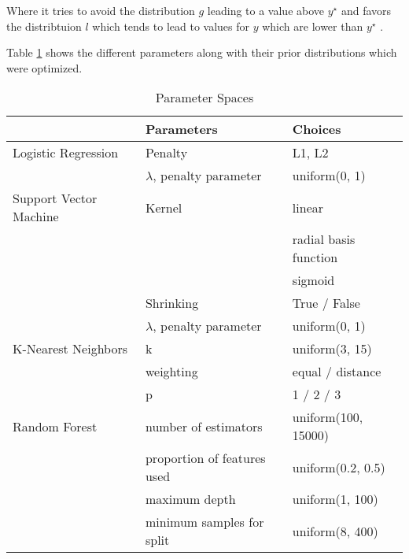 Where it tries to avoid the distribution $g$ leading to a value above $y^\star$ and favors the distribtuion $l$ which tends to lead to values for $y$ which are lower than $y^\star$ \cite{tpe}.

Table \ref{spaces} shows the different parameters along with their prior distributions which were optimized.

\begin{table}
\centering
\caption{Parameter Spaces}
\label{spaces}
\begin{tabular}{lll}
                            & Parameters                  & Choices                                \\ \hline
Logistic Regression         & Penalty                     & L1, L2                                 \\
                            & $\lambda$, penalty parameter       & uniform(0, 1)                          \\
Support Vector Machine      & Kernel                      & linear \\
                            &                             & radial basis function\\
                            &                             &  sigmoid \\
                            & Shrinking                   & True / False                           \\
                            & $\lambda$, penalty parameter                      & uniform(0, 1)                          \\
K-Nearest Neighbors         & k                           & uniform(3, 15)                         \\
                            & weighting                   & equal / distance                       \\
                            & p                           & 1  / 2 / 3                             \\
Random Forest               & number of estimators        & uniform(100, 15000)                    \\
                            & proportion of features used & uniform(0.2, 0.5)                      \\
                            & maximum depth               & uniform(1, 100)                        \\
                            & minimum samples for split   & uniform(8, 400)                        \\

\end{tabular}
\end{table}
